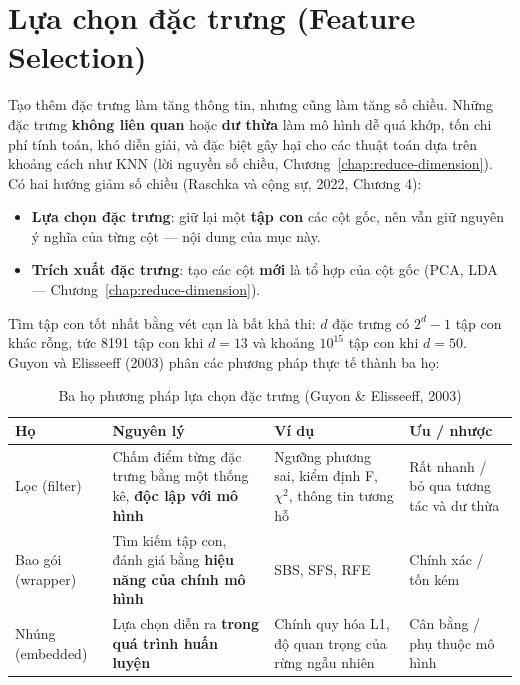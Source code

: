 \section{Lựa chọn đặc trưng (Feature Selection)}
\label{sec:feature-selection}

Tạo thêm đặc trưng làm tăng thông tin, nhưng cũng làm tăng số chiều. Những đặc trưng \textbf{không liên quan} hoặc \textbf{dư thừa} làm mô hình dễ quá khớp, tốn chi phí tính toán, khó diễn giải, và đặc biệt gây hại cho các thuật toán dựa trên khoảng cách như KNN (lời nguyền số chiều, Chương~\ref{chap:reduce-dimension}). Có hai hướng giảm số chiều (Raschka và cộng sự, 2022, Chương 4):
\begin{itemize}
    \item \textbf{Lựa chọn đặc trưng}: giữ lại một \textbf{tập con} các cột gốc, nên vẫn giữ nguyên ý nghĩa của từng cột --- nội dung của mục này.
    \item \textbf{Trích xuất đặc trưng}: tạo các cột \textbf{mới} là tổ hợp của cột gốc (PCA, LDA --- Chương~\ref{chap:reduce-dimension}).
\end{itemize}
Tìm tập con tốt nhất bằng vét cạn là bất khả thi: $d$ đặc trưng có $2^d - 1$ tập con khác rỗng, tức 8191 tập con khi $d = 13$ và khoảng $10^{15}$ tập con khi $d = 50$. Guyon và Elisseeff (2003) phân các phương pháp thực tế thành ba họ:

\begin{table}[H]
\centering
\begin{tabular}{|p{2.4cm}|p{4.6cm}|p{2.9cm}|p{3.2cm}|}
\hline
\textbf{Họ} & \textbf{Nguyên lý} & \textbf{Ví dụ} & \textbf{Ưu / nhược} \\
\hline
Lọc (filter) & Chấm điểm từng đặc trưng bằng một thống kê, \textbf{độc lập với mô hình} & Ngưỡng phương sai, kiểm định F, $\chi^2$, thông tin tương hỗ & Rất nhanh / bỏ qua tương tác và dư thừa \\ \hline
Bao gói (wrapper) & Tìm kiếm tập con, đánh giá bằng \textbf{hiệu năng của chính mô hình} & SBS, SFS, RFE & Chính xác / tốn kém \\ \hline
Nhúng (embedded) & Lựa chọn diễn ra \textbf{trong quá trình huấn luyện} & Chính quy hóa L1, độ quan trọng của rừng ngẫu nhiên & Cân bằng / phụ thuộc mô hình \\ \hline
\end{tabular}
\caption{Ba họ phương pháp lựa chọn đặc trưng (Guyon \& Elisseeff, 2003)}
\label{tab:fs-families}
\end{table}

